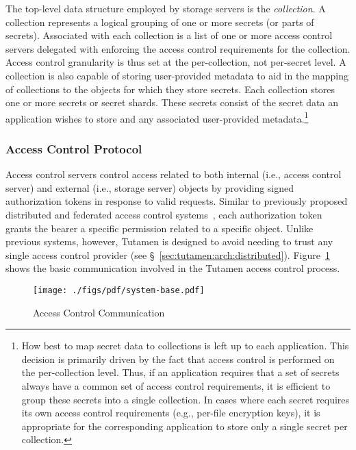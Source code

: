 The top-level data structure employed by storage servers is the
\textit{collection}. A collection represents a logical grouping of one
or more secrets (or parts of secrets). Associated with each collection
is a list of one or more access control servers delegated with
enforcing the access control requirements for the collection. Access
control granularity is thus set at the per-collection, not per-secret
level. A collection is also capable of storing user-provided metadata
to aid in the mapping of collections to the objects for which they
store secrets. Each collection stores one or more secrets or secret
shards. These secrets consist of the secret data an application wishes
to store and any associated user-provided metadata.\footnote{How best
  to map secret data to collections is left up to each
  application. This decision is primarily driven by the fact that
  access control is performed on the per-collection level. Thus, if an
  application requires that a set of secrets always have a common set
  of access control requirements, it is efficient to group these
  secrets into a single collection. In cases where each secret
  requires its own access control requirements (e.g., per-file
  encryption keys), it is appropriate for the corresponding
  application to store only a single secret per collection.}

\subsubsection{Access Control Protocol}
\label{sec:tutamen:arch:acp}

Access control servers control access related to both internal (i.e.,
access control server) and external (i.e., storage server) objects by
providing signed authorization tokens in response to valid
requests. Similar to previously proposed distributed and federated
access control systems~\cite{calero2010, leandro2012, neuman1994},
each authorization token grants the bearer a specific permission
related to a specific object. Unlike previous systems, however,
Tutamen is designed to avoid needing to trust any single access
control provider (see \S~\ref{sec:tutamen:arch:distributed}).
Figure~\ref{fig:tutamen:systembase} shows the basic communication
involved in the Tutamen access control process.

\begin{figure}[th]
  \centering
  \texttt{[image: ./figs/pdf/system-base.pdf]}
  \caption{Access Control Communication}
  \label{fig:tutamen:systembase}
\end{figure}

